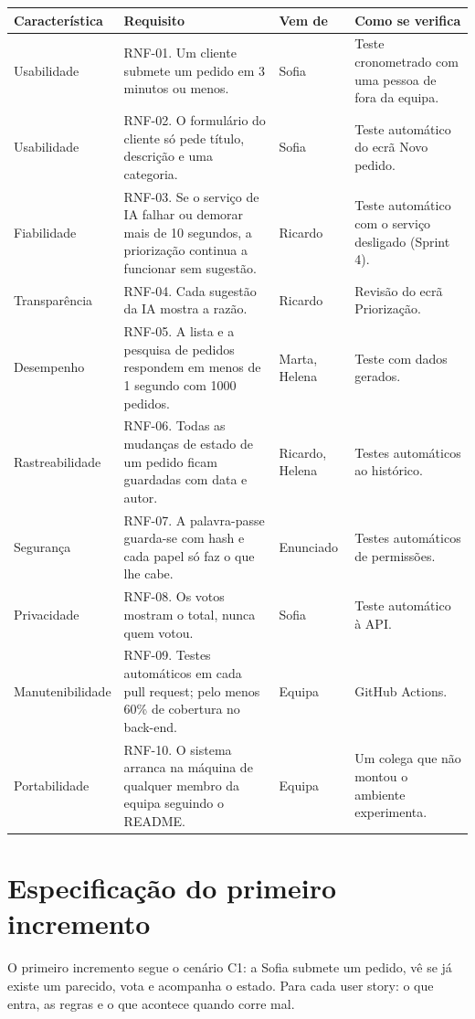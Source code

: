 \documentclass[11pt,a4paper]{article}
\begin{document}
\small
\begin{tabularx}{\textwidth}{@{}p{2.4cm} Y p{2.1cm} Y@{}}
\toprule
\textbf{Característica} & \textbf{Requisito} & \textbf{Vem de} & \textbf{Como se verifica} \\
\midrule
Usabilidade & RNF-01. Um cliente submete um pedido em 3 minutos ou menos. & Sofia & Teste cronometrado com uma pessoa de fora da equipa. \\
Usabilidade & RNF-02. O formulário do cliente só pede título, descrição e uma categoria. & Sofia & Teste automático do ecrã Novo pedido. \\
Fiabilidade & RNF-03. Se o serviço de IA falhar ou demorar mais de 10 segundos, a priorização continua a funcionar sem sugestão. & Ricardo & Teste automático com o serviço desligado (Sprint 4). \\
Transparência & RNF-04. Cada sugestão da IA mostra a razão. & Ricardo & Revisão do ecrã Priorização. \\
Desempenho & RNF-05. A lista e a pesquisa de pedidos respondem em menos de 1 segundo com 1000 pedidos. & Marta, Helena & Teste com dados gerados. \\
Rastreabilidade & RNF-06. Todas as mudanças de estado de um pedido ficam guardadas com data e autor. & Ricardo, Helena & Testes automáticos ao histórico. \\
Segurança & RNF-07. A palavra-passe guarda-se com hash e cada papel só faz o que lhe cabe. & Enunciado & Testes automáticos de permissões. \\
Privacidade & RNF-08. Os votos mostram o total, nunca quem votou. & Sofia & Teste automático à API. \\
Manutenibilidade & RNF-09. Testes automáticos em cada pull request; pelo menos 60\% de cobertura no back-end. & Equipa & GitHub Actions. \\
Portabilidade & RNF-10. O sistema arranca na máquina de qualquer membro da equipa seguindo o README. & Equipa & Um colega que não montou o ambiente experimenta. \\
\bottomrule
\end{tabularx}
\normalsize

\section{Especificação do primeiro incremento}

O primeiro incremento segue o cenário C1: a Sofia submete um pedido, vê se já existe um parecido, vota e acompanha o estado. Para cada user story: o que entra, as regras e o que acontece quando corre mal.
\end{document}
